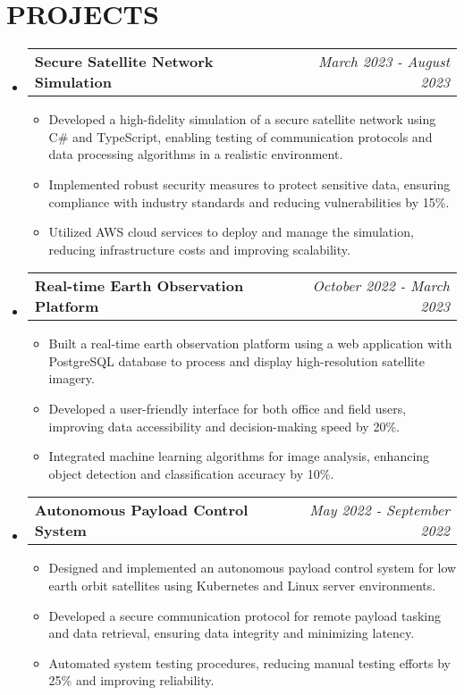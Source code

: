 \documentclass[letterpaper,11pt]{article}
\makeatletter
\newcommand{\resumeItem}[1]{\item\small{{#1 \vspace{-3pt}}}}
\newcommand{\resumeProjectHeading}[2]{\item\begin{tabular*}{0.97\textwidth}{l@{\extracolsep{\fill}}r}\small#1 & #2 \\ \end{tabular*}\vspace{-7pt}}
\newcommand{\resumeSubHeadingListStart}{\begin{itemize}[leftmargin=0.15in, label={}]}
\newcommand{\resumeSubHeadingListEnd}{\end{itemize}}
\newcommand{\resumeItemListStart}{\begin{itemize}}
\newcommand{\resumeItemListEnd}{\end{itemize}\vspace{-5pt}}
\makeatother
\begin{document}
\section{{\fontsize{9pt}{20pt}\selectfont \textbf{PROJECTS}}}\resumeSubHeadingListStart
\resumeProjectHeading{\textbf{Secure Satellite Network Simulation}}{\textit{March 2023 - August 2023}}
\resumeItemListStart
\resumeItem{Developed a high-fidelity simulation of a secure satellite network using C\# and TypeScript, enabling testing of communication protocols and data processing algorithms in a realistic environment.}
\resumeItem{Implemented robust security measures to protect sensitive data, ensuring compliance with industry standards and reducing vulnerabilities by 15\%.}
\resumeItem{Utilized AWS cloud services to deploy and manage the simulation, reducing infrastructure costs and improving scalability.}
\resumeItemListEnd\vspace{-6pt}
\resumeProjectHeading{\textbf{Real-time Earth Observation Platform}}{\textit{October 2022 - March 2023}}
\resumeItemListStart
\resumeItem{Built a real-time earth observation platform using a web application with PostgreSQL database to process and display high-resolution satellite imagery.}
\resumeItem{Developed a user-friendly interface for both office and field users, improving data accessibility and decision-making speed by 20\%.}
\resumeItem{Integrated machine learning algorithms for image analysis, enhancing object detection and classification accuracy by 10\%.}
\resumeItemListEnd\vspace{-6pt}
\resumeProjectHeading{\textbf{Autonomous Payload Control System}}{\textit{May 2022 - September 2022}}
\resumeItemListStart
\resumeItem{Designed and implemented an autonomous payload control system for low earth orbit satellites using Kubernetes and Linux server environments.}
\resumeItem{Developed a secure communication protocol for remote payload tasking and data retrieval, ensuring data integrity and minimizing latency.}
\resumeItem{Automated system testing procedures, reducing manual testing efforts by 25\% and improving reliability.}
\resumeItemListEnd
\resumeSubHeadingListEnd\vspace{-17pt}
\end{document}
